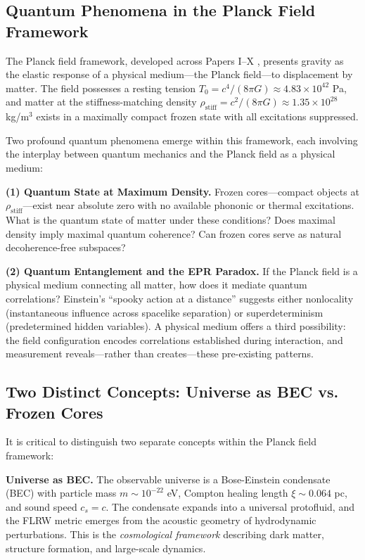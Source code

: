 \documentclass[11pt,a4paper]{article}
\newcommand{\rhostiff}{\ensuremath{\rho_{\mathrm{stiff}}}}
\newcommand{\Tzero}{\ensuremath{T_0}}
\newcommand{\cs}{\ensuremath{c_s}}
\newcommand{\xihealing}{\ensuremath{\xi}}
\theoremstyle{definition}
\theoremstyle{remark}
\begin{document}
\subsection{Quantum Phenomena in the Planck Field Framework}
\label{sec:motivation}

The Planck field framework, developed across Papers I--X \cite{SkavbergBEC2025,SkavbergLensing2025,SkavbergQG2025,SkavbergFrozen2025}, presents gravity as the elastic response of a physical medium---the Planck field---to displacement by matter. The field possesses a resting tension $\Tzero = c^4/(8\pi G) \approx 4.83 \times 10^{42}$ Pa, and matter at the stiffness-matching density $\rhostiff = c^2/(8\pi G) \approx 1.35 \times 10^{28}$ kg/m$^3$ exists in a maximally compact frozen state with all excitations suppressed.

Two profound quantum phenomena emerge within this framework, each involving the interplay between quantum mechanics and the Planck field as a physical medium:

\textbf{(1) Quantum State at Maximum Density.} Frozen cores---compact objects at $\rhostiff$---exist near absolute zero with no available phononic or thermal excitations. What is the quantum state of matter under these conditions? Does maximal density imply maximal quantum coherence? Can frozen cores serve as natural decoherence-free subspaces?

\textbf{(2) Quantum Entanglement and the EPR Paradox.} If the Planck field is a physical medium connecting all matter, how does it mediate quantum correlations? Einstein's ``spooky action at a distance'' \cite{EPR1935} suggests either nonlocality (instantaneous influence across spacelike separation) or superdeterminism (predetermined hidden variables). A physical medium offers a third possibility: the field configuration encodes correlations established during interaction, and measurement reveals---rather than creates---these pre-existing patterns.

\subsection{Two Distinct Concepts: Universe as BEC vs. Frozen Cores}
\label{sec:two_concepts}

It is critical to distinguish two separate concepts within the Planck field framework:

\textbf{Universe as BEC.} The observable universe is a Bose-Einstein condensate (BEC) with particle mass $m \sim 10^{-22}$ eV, Compton healing length $\xihealing \sim 0.064$ pc, and sound speed $\cs = c$. The condensate expands into a universal protofluid, and the FLRW metric emerges from the acoustic geometry of hydrodynamic perturbations. This is the \emph{cosmological framework} describing dark matter, structure formation, and large-scale dynamics.
\end{document}
